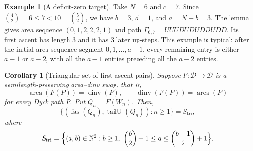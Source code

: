 \documentclass[11pt]{article}
\newtheorem{corollary}[theorem]{Corollary}
\theoremstyle{definition}
\newtheorem{example}[theorem]{Example}
\newcommand{\D}{\mathcal D}
\newcommand{\N}{\mathbb N}
\newcommand{\area}{\operatorname{area}}
\newcommand{\dinv}{\operatorname{dinv}}
\newcommand{\fas}{\operatorname{fas}}
\newcommand{\tailU}{\operatorname{tailU}}
\begin{document}
\begin{example}[A deficit-zero target]
Take $N=6$ and $c=7$.  Since $\binom 42=6\le 7<10=\binom 52$, we have
$b=3$, $d=1$, and $a=N-b=3$.  The lemma gives area sequence
$(0,1,2,2,2,1)$ and path $\Gamma_{6,7}=UUUDUDUDDUDD$.
Its first ascent has length $3$ and it has $3$ later up-steps.  This example is
typical: after the initial area-sequence segment $0,1,\ldots,a-1$, every
remaining entry is either $a-1$ or $a-2$, with all the $a-1$ entries preceding
all the $a-2$ entries.
\end{example}

\begin{corollary}[Triangular set of first-ascent pairs]
\label{cor:forced-triangular-pairs}
Suppose $F\colon\D\to\D$ is a semilength-preserving area--dinv swap, that is,
\[
   \area(F(P))=\dinv(P),\qquad \dinv(F(P))=\area(P)
\]
for every Dyck path $P$.  Put $Q_n=F(W_n)$.  Then,
\[
   \{(\fas(Q_n),\tailU(Q_n)):n\ge 1\}=S_{\mathrm{tri}},
\]
where
\[
   S_{\mathrm{tri}}=
   \Bigl\{(a,b)\in\N^2: b\ge 1,\ \binom b2+1\le a\le\binom{b+1}{2}+1\Bigr\}.
\]
\end{corollary}
\end{document}
